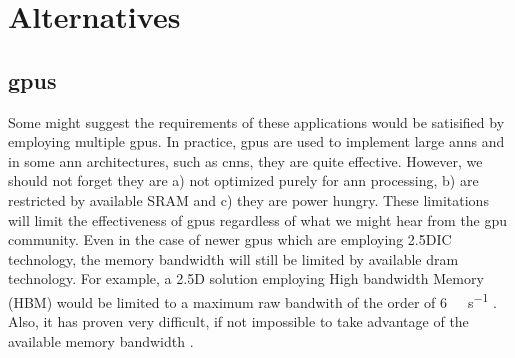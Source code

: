 \iffalse
We believe a system can be designed with \ac{dram} as the primary processing store. This will require careful use of data structures to describe storage within \ac{dram} to ensure we make good use of the potential bandwidth. But there are other benefits we will take advantage of, but more about that later.
\fi

\iffalse
There important application is disparate \ac{ann}s because specifically a form of \ac{dnn}, Convolutional Neural networks (\ac{cnn}) have gotten good press recently, but they are not the only \ac{dnn}.
\fi



\iffalse
So considering the performance improvements observed in other applications, it is expected that many customer facing or edge applications will implement multiple instances of artificial neural networks to perform various functions.
have very large memory and processing requirements.
require multiple instances of \ac{ann}s of similar size to the \ac{ann} described in \cite{krizhevsky2012imagenet}.

For example employing multiple cameras or monitoring and controlling different systems in a drone, a automobile each with an image recognition \ac{ann}\cite{krizhevsky2012imagenet}\cite{bojarski2016end} for navigation, engine monitoring along with other system control.
\fi

\section{Alternatives}
\label{sec:Alternatives}

\subsection{\Acfp{gpu}}
\label{sec:gpu}
Some might suggest the requirements of these applications would be satisified by employing multiple \acp{gpu}.
In practice, \acp{gpu} are used to implement large \ac{ann}s and in some \ac{ann} architectures, such as \acp{cnn}, they are quite effective. However, we should not forget they are a) not optimized purely for \ac{ann} processing, b) are restricted by available SRAM and c) they are power hungry. 
These limitations will limit the effectiveness of \acp{gpu} regardless of what we might hear from the \ac{gpu} community.
Even in the case of newer \acp{gpu} which are employing 2.5DIC technology, the memory bandwidth will still be limited by available \ac{dram} technology.
For example, a 2.5D solution employing High bandwidth Memory (HBM) would be limited to a maximum raw bandwith of the order of \SI[per-mode=symbol]{6}{\tera \bit \per \second} \cite{Nvidia_p100_summary_datasheet}.
Also, it has proven very difficult, if not impossible to take advantage of the available memory bandwidth \cite{farabet2011neuflow} \cite{tensorflow2015-whitepaper}.

